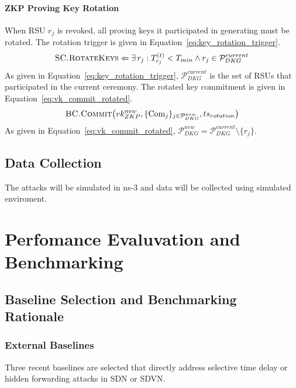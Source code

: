 \documentclass[12pt, a4paper]{report}
\begin{document}
{{\subsubsection{ZKP Proving Key Rotation}
When \ac{RSU} $r_j$ is revoked, all proving keys it
participated in generating must be rotated. The rotation
trigger is given in
Equation~\eqref{eq:key_rotation_trigger}.
\begin{equation}
\textsc{SC.RotateKeys}\Leftarrow
\exists\,r_j:T_{r_j}^{(t)}<T_{min}
\land r_j\in\mathcal{P}_{DKG}^{current}
\label{eq:key_rotation_trigger}
\end{equation}
As given in Equation~\eqref{eq:key_rotation_trigger},
$\mathcal{P}_{DKG}^{current}$ is the set of \ac{RSU}s
that participated in the current ceremony. The rotated
key commitment is given in
Equation~\eqref{eq:vk_commit_rotated}.
\begin{equation}
\textsc{BC.Commit}\!\left(vk_{ZKP}^{new},
\{\text{Com}_j\}_{j\in\mathcal{P}_{DKG}^{new}},
ts_{rotation}\right)
\label{eq:vk_commit_rotated}
\end{equation}
As given in Equation~\eqref{eq:vk_commit_rotated},
$\mathcal{P}_{DKG}^{new}{=}
\mathcal{P}_{DKG}^{current}\setminus\{r_j\}$.










\section{Data Collection}
The attacks will be simulated in ns-3 and data will be collected using simulated enviroment.



\chapter{Perfomance Evaluvation and Benchmarking}
\section{Baseline Selection and Benchmarking Rationale}
\label{sec:baselines}

\subsection{External Baselines}
Three recent baselines are selected that directly address selective
time delay or hidden forwarding attacks in SDN or SDVN.

}}
\end{document}
